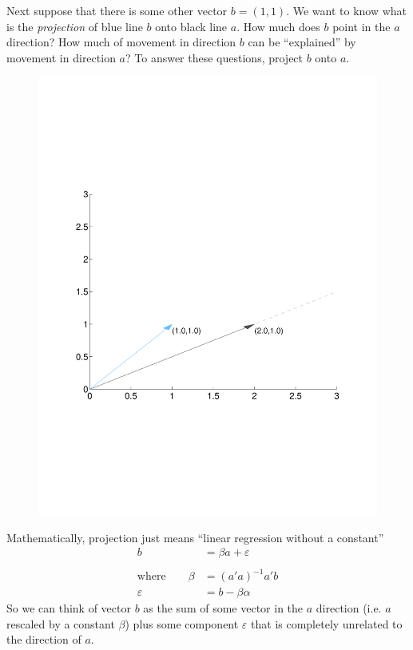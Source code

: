 \documentclass[a4paper,12pt]{scrartcl}
\begin{document}
Next suppose that there is some other vector $b=(1,1)$. We want to know
what is the \emph{projection} of blue line $b$ onto black line $a$.
How much does $b$ point in the $a$ direction? How much of movement in
direction $b$ can be ``explained'' by movement in direction $a$?
To answer these questions, project $b$ onto $a$.
\begin{figure}[htpb!]
  \centering
  \includegraphics[scale=0.5, trim={2cm, 7cm, 2cm, 7cm}, clip]{Plots/StateSpaceGeometry2.pdf}
\end{figure}

Mathematically, projection just means ``linear regression without a
constant''
\begin{align*}
  b &= \beta a + \varepsilon \\\\
  \text{where}\qquad
  \beta &= (a'a)^{-1}a'b\\
  \varepsilon &= b - \beta \alpha
\end{align*}
So we can think of vector $b$ as the sum of some vector in the $a$
direction (i.e. $a$ rescaled by a constant $\beta$) plus some component
$\varepsilon$ that is completely unrelated to the direction of $a$.
\end{document}
